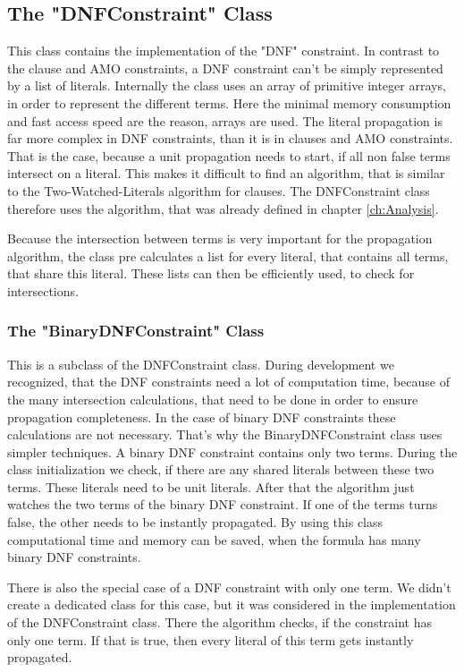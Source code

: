\subsection{The "DNFConstraint" Class}

This class contains the implementation of the "DNF" constraint. In contrast to the clause and AMO constraints, a DNF constraint can't be simply represented by a list of literals. Internally the class uses an array of primitive integer arrays, in order to represent the different terms. Here the minimal memory consumption and fast access speed are the reason, arrays are used. The literal propagation is far more complex in DNF constraints, than it is in clauses and AMO constraints. That is the case, because a unit propagation needs to start, if all non false terms intersect on a literal. This makes it difficult to find an algorithm, that is similar to the Two-Watched-Literals algorithm for clauses. The DNFConstraint class therefore uses the algorithm, that was already defined in chapter \ref{ch:Analysis}.
\par
Because the intersection between terms is very important for the propagation algorithm, the class pre calculates a list for every literal, that contains all terms, that share this literal. These lists can then be efficiently used, to check for intersections.

\subsubsection{The "BinaryDNFConstraint" Class}

This is a subclass of the DNFConstraint class. During development we recognized, that the DNF constraints need a lot of computation time, because of the many intersection calculations, that need to be done in order to ensure propagation completeness. In the case of binary DNF constraints these calculations are not necessary. That's why the BinaryDNFConstraint class uses simpler techniques. A binary DNF constraint contains only two terms. During the class initialization we check, if there are any shared literals between these two terms. These literals need to be unit literals. After that the algorithm just watches the two terms of the binary DNF constraint. If one of the terms turns false, the other needs to be instantly propagated. By using this class computational time and memory can be saved, when the formula has many binary DNF constraints.

There is also the special case of a DNF constraint with only one term. We didn't create a dedicated class for this case, but it was considered in the implementation of the DNFConstraint class. There the algorithm checks, if the constraint has only one term. If that is true, then every literal of this term gets instantly propagated.

